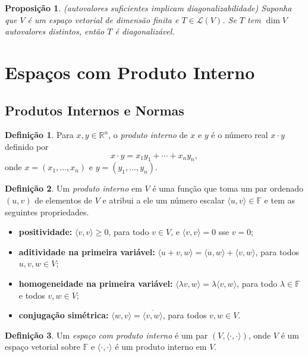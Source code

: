 \documentclass[12pt]{article}
\theoremstyle{plain}
\newtheorem{prop}[thm]{Proposição}
\theoremstyle{definition}
\newtheorem{defn}{Definição}[section]
\theoremstyle{remark}
\begin{document}
\begin{prop} (autovalores suficientes implicam diagonalizabilidade)
    Suponha que \(V\) é um espaço vetorial de dimensão finita e \(T \in \mathcal{L}(V)\). Se \(T\) tem \(\dim V\) autovalores distintos, então \(T\) é diagonalizável.
\end{prop}

\section{Espaços com Produto Interno}
\subsection{Produtos Internos e Normas}

\begin{defn}
    Para \(x, y \in \mathbb{R}^n\), o \emph{produto interno} de \(x\) e \(y\) é o número real \(x \cdot y\) definido por
    \[
        x \cdot y = x_1 y_1 + \cdots + x_n y_n,
    \]
    \noindent onde \(x = (x_1, \ldots, x_n)\) e \(y = (y_1, \ldots, y_n)\).
\end{defn}

\begin{defn}
    Um \emph{produto interno} em \(V\) é uma função que toma um par ordenado \((u, v)\) de elementos de \(V\) e atribui a ele um número escalar \(\langle u, v \rangle \in \mathbb{F}\) e tem as seguintes propriedades.
    \begin{itemize}
        \item \textbf{positividade:} \(\langle v, v \rangle \geq 0\), para todo \(v \in V\), e \(\langle v, v \rangle = 0\) sse \(v = 0\);
        \item \textbf{aditividade na primeira variável:} \(\langle u + v, w \rangle = \langle u, w \rangle + \langle v, w \rangle\), para todos \(u, v, w \in V\);
        \item \textbf{homogeneidade na primeira variável:} \(\langle \lambda v, w \rangle = \lambda \langle v, w \rangle\), para todo \(\lambda \in \mathbb{F}\) e todos \(v, w \in V\);
        \item \textbf{conjugação simétrica:} \(\langle w, v \rangle = \overline{\langle v, w \rangle}\), para todos \(v, w \in V\).
    \end{itemize}
\end{defn}

\begin{defn}
    Um \emph{espaço com produto interno} é um par \((V, \langle \cdot, \cdot \rangle)\), onde \(V\) é um espaço vetorial sobre \(\mathbb{F}\) e \(\langle \cdot, \cdot \rangle\) é um produto interno em \(V\).
\end{defn}
\end{document}

